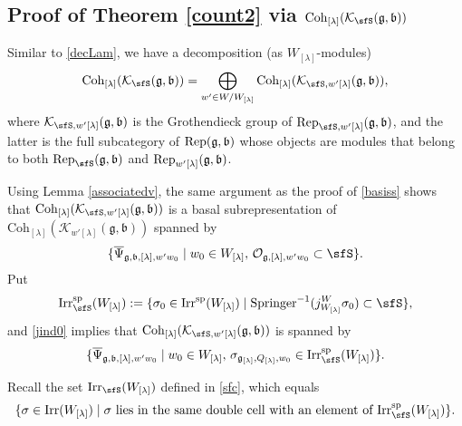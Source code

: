 \documentclass[12pt,a4paper]{amsart}
\newcommand{\CK}{{\mathcal {K}}}
\newcommand{\CO}{{\mathcal {O}}}
\newcommand{\g}{\mathfrak g}
\renewcommand{\b}{\mathfrak b}
\newcommand{\be}{\begin {equation}}
\newcommand{\ee}{\end {equation}}
\numberwithin{equation}{section}
\theoremstyle{remark}
\def\Irr{\mathrm{Irr}}
\def\Coh{\mathrm{Coh}}
\newcommand{\Lam}{{[\lambda]}}
\begin{document}
\subsection{Proof of Theorem \ref{count2} via $\Coh_{\Lam}(\CK_\sfS(\g,\b))$}

Similar to  \eqref{decLam}, we have a decomposition (as $W_\Lam$-modules)
\be\label{decLam2}
 \Coh_{\Lam}( \CK_\sfS(\g,\b))=\bigoplus_{w'\in W/W_\Lam}\Coh_{\Lam}(\CK_{ \sfS, w'\Lam}(\g, \b) ),
\ee
where $\CK_{ \sfS, w'\Lam}(\g, \b)$ is the Grothendieck group of $\Rep_{ \sfS, w'\Lam}(\g, \b)$, and the latter is the full subcategory of
$\Rep(\g, \b)$ whose objects are modules that belong to both $\Rep_{ \sfS}(\g, \b)$ and $\Rep_{w'\Lam}(\g, \b)$.


Using Lemma \ref{associatedv}, the same argument as  the proof of \eqref{basiss} shows that  $\Coh_{\Lam}(\CK_{ \sfS, w'\Lam}(\g, \b) )$ is a basal subrepresentation of $\Coh_{\Lam}(\CK_{ w'\Lam}(\g, \b) )$ spanned by
\[
 \{ \overline \Psi_{\g,\b, \Lam, w'w_0}\mid w_0\in W_\Lam, \, \CO_{\g, \Lam, w'w_0}\subset \sfS \}.
\]
Put
\[
   \Irr_\sfS^{\mathrm{sp}}(W_\Lam):=\{\sigma_0\in  \Irr^{\mathrm{sp}}(W_\Lam)\mid \mathrm{Springer}^{-1}(j_{W_\Lam}^W \sigma_0)\subset \sfS\},
\]
and \eqref{jind0} implies that $\Coh_{\Lam}(\CK_{ \sfS, w'\Lam}(\g, \b) )$ is  spanned by
\be\label{setbasal}
 \{ \overline \Psi_{\g,\b, \Lam, w'w_0}\mid w_0\in W_\Lam, \,  \sigma_{\g_\Lam, Q_\Lam, w_0}\in   \Irr_\sfS^{\mathrm{sp}}(W_\Lam) \}.
\ee

Recall the set $\Irr_\sfS(W_\Lam)$ defined in \eqref{sfc}, which equals
\[
    \{\sigma \in \Irr(W_\Lam)\mid \textrm{$\sigma$ lies in the same double cell with an element of $ \Irr_\sfS^{\mathrm{sp}}(W_\Lam)$}  \}.
\]
\end{document}
